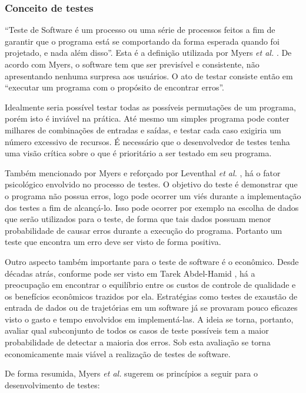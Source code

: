 \hypertarget{conceito-de-testes}{%
\subsubsection{Conceito de testes}\label{conceito-de-testes}}

``Teste de Software é um processo ou uma série de processos feitos a fim de garantir que o programa está se comportando da forma esperada quando foi projetado, e nada além disso''. Esta é a definição utilizada por Myers \emph{et al.} \cite{myers}. De acordo com Myers, o software tem que ser previsível e consistente, não apresentando nenhuma surpresa aos usuários. O ato de testar consiste então em ``executar um programa com o propósito de encontrar erros''.

Idealmente seria possível testar todas as possíveis permutações de um programa, porém isto é inviável na prática. Até mesmo um simples programa pode conter milhares de combinações de entradas e saídas, e testar cada caso exigiria um número excessivo de recursos. É necessário que o desenvolvedor de testes tenha uma visão crítica sobre o que é prioritário a ser testado em seu programa.

Também mencionado por Myers e reforçado por Leventhal \emph{et al.} \cite{leventhal}, há o fator psicológico envolvido no processo de testes. O objetivo do teste é demonstrar que o programa não possua erros, logo pode ocorrer um viés durante a implementação dos testes a fim de alcançá-lo. Isso pode ocorrer por exemplo na escolha de dados que serão utilizados para o teste, de forma que tais dados possuam menor probabilidade de causar erros durante a execução do programa. Portanto um teste que encontra um erro deve ser visto de forma positiva.

Outro aspecto também importante para o teste de software é o econômico. Desde décadas atrás, conforme pode ser visto em Tarek Abdel-Hamid \cite{abdel}, há a preocupação em encontrar o equilíbrio entre os custos de controle de qualidade e os benefícios econômicos trazidos por ela. Estratégias como testes de exaustão de entrada de dados ou de trajetórias em um software já se provaram pouco eficazes visto o gasto e tempo envolvidos em implementá-las. A ideia se torna, portanto, avaliar qual subconjunto de todos os casos de teste possíveis tem a maior probabilidade de detectar a maioria dos erros. Sob esta avaliação se torna economicamente mais viável a realização de testes de software.

De forma resumida, Myers \emph{et al.} \cite{myers} sugerem os princípios a seguir para o desenvolvimento de testes:

